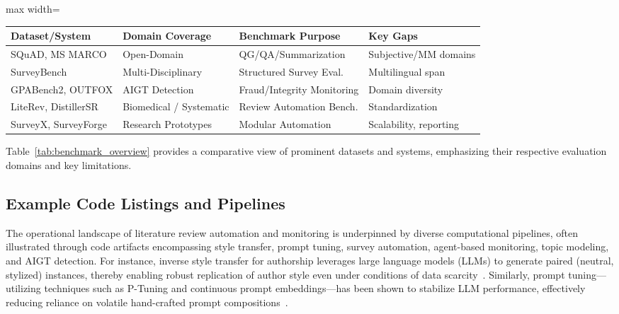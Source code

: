 \begin{table*}[htbp]
\centering
\caption{Overview of representative benchmark datasets and systems, highlighting domain focus, core evaluation roles, and current gaps.}
\label{tab:benchmark_overview}
\begin{adjustbox}{max width=\textwidth}
\begin{tabular}{@{}llll@{}}
\toprule
\textbf{Dataset/System} & \textbf{Domain Coverage} & \textbf{Benchmark Purpose} & \textbf{Key Gaps} \\
\midrule
SQuAD, MS MARCO        & Open-Domain              & QG/QA/Summarization        & Subjective/MM domains \\
SurveyBench            & Multi-Disciplinary       & Structured Survey Eval.    & Multilingual span     \\
GPABench2, OUTFOX      & AIGT Detection           & Fraud/Integrity Monitoring & Domain diversity      \\
LiteRev, DistillerSR   & Biomedical / Systematic  & Review Automation Bench.   & Standardization       \\
SurveyX, SurveyForge   & Research Prototypes      & Modular Automation         & Scalability, reporting\\
\bottomrule
\end{tabular}
\end{adjustbox}
\end{table*}

Table~\ref{tab:benchmark_overview} provides a comparative view of prominent datasets and systems, emphasizing their respective evaluation domains and key limitations.

\subsection{Example Code Listings and Pipelines}

The operational landscape of literature review automation and monitoring is underpinned by diverse computational pipelines, often illustrated through code artifacts encompassing style transfer, prompt tuning, survey automation, agent-based monitoring, topic modeling, and AIGT detection. For instance, inverse style transfer for authorship leverages large language models (LLMs) to generate paired (neutral, stylized) instances, thereby enabling robust replication of author style even under conditions of data scarcity~\cite{ref77}. Similarly, prompt tuning---utilizing techniques such as P-Tuning and continuous prompt embeddings---has been shown to stabilize LLM performance, effectively reducing reliance on volatile hand-crafted prompt compositions~\cite{ref78}\cite{ref103}.

